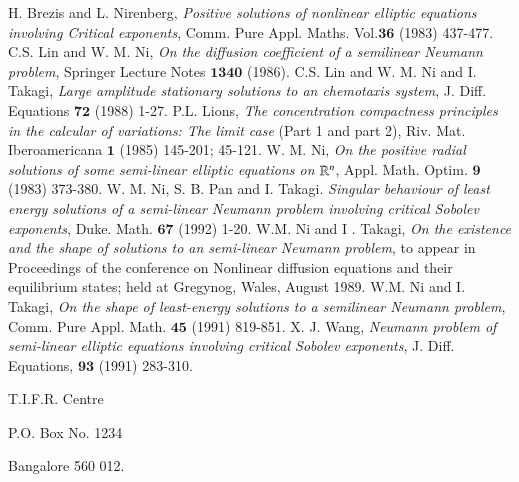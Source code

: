 \begin{thebibliography}{99}
 H. Brezis and L. Nirenberg, \textit{Positive solutions of nonlinear elliptic equations involving Critical exponents}, Comm. Pure Appl. Maths. Vol.${\mathbf{36}}$ (1983) 437-477.
 C.S. Lin and W. M. Ni, \textit{On the diffusion coefficient of a semilinear Neumann problem}, Springer Lecture Notes ${\mathbf{1340}}$ (1986).
 C.S. Lin and W. M. Ni and I. Takagi, \textit{Large amplitude stationary solutions to an chemotaxis system}, J. Diff. Equations ${\mathbf{72}}$ (1988) 1-27.  
 P.L. Lions, \textit{The concentration compactness principles in the calcular of variations: The limit case} (Part 1 and part 2), Riv. Mat. Iberoamericana ${\mathbf{1}}$ (1985) 145-201; 45-121.
 W. M. Ni, \textit{On the positive radial solutions of some semi-linear elliptic equations on} $\mathbb{R}^{n}$, Appl. Math. Optim. ${\mathbf{9}}$ (1983) 373-380.
 W. M. Ni, S. B. Pan and I. Takagi. \textit{Singular behaviour of least energy solutions of a semi-linear Neumann problem involving critical Sobolev exponents}, Duke. Math. ${\mathbf{67}}$ (1992) 1-20.
 W.M. Ni and I . Takagi, \textit{On the existence and the shape of solutions to an semi-linear Neumann problem}, to appear in Proceedings of the conference on Nonlinear diffusion equations and their equilibrium states; held at Gregynog, Wales, August 1989.
 W.M. Ni and I. Takagi, \textit{On the shape of least-energy solutions to a semilinear Neumann problem}, Comm. Pure Appl. Math. ${\mathbf{45}}$ (1991) 819-851.
 X. J. Wang, \textit{Neumann problem of semi-linear elliptic equations involving critical Sobolev exponents}, J. Diff. Equations, ${\mathbf{93}}$ (1991) 283-310.
\end{thebibliography}

\begin{flushleft}
T.I.F.R. Centre

P.O. Box No. 1234

Bangalore 560 012.
\end{flushleft}
